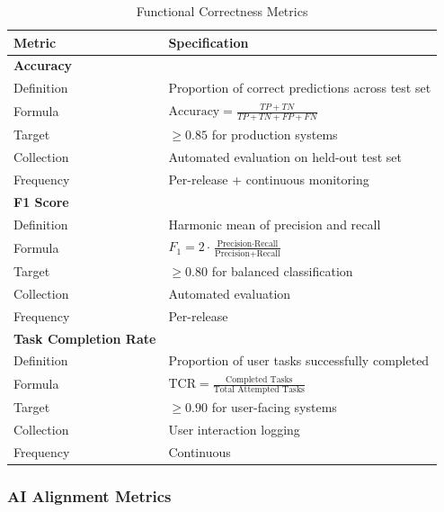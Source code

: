 \begin{table}[!htbp]
\centering
\caption{Functional Correctness Metrics}
\label{tab:functional_metrics}
\small
\begin{tabularx}{\linewidth}{@{}l X@{}}
\toprule
\textbf{Metric} & \textbf{Specification} \\
\midrule
\textbf{Accuracy} & \\
Definition & Proportion of correct predictions across test set \\
Formula & $\text{Accuracy} = \frac{TP + TN}{TP + TN + FP + FN}$ \\
Target & $\geq 0.85$ for production systems \\
Collection & Automated evaluation on held-out test set \\
Frequency & Per-release + continuous monitoring \\
\addlinespace

\textbf{F1 Score} & \\
Definition & Harmonic mean of precision and recall \\
Formula & $F_1 = 2 \cdot \frac{\text{Precision} \cdot \text{Recall}}{\text{Precision} + \text{Recall}}$ \\
Target & $\geq 0.80$ for balanced classification \\
Collection & Automated evaluation \\
Frequency & Per-release \\
\addlinespace

\textbf{Task Completion Rate} & \\
Definition & Proportion of user tasks successfully completed \\
Formula & $\text{TCR} = \frac{\text{Completed Tasks}}{\text{Total Attempted Tasks}}$ \\
Target & $\geq 0.90$ for user-facing systems \\
Collection & User interaction logging \\
Frequency & Continuous \\
\bottomrule
\end{tabularx}
\end{table}

\subsubsection{AI Alignment Metrics}

